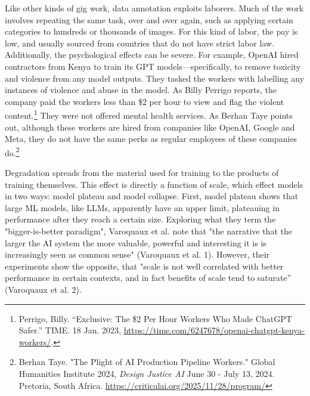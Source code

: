 \documentclass[11pt]{article}
\begin{document}
\begin{enumerate}
Like other kinds of gig work, data annotation exploits laborers. Much
of the work involves repeating the same task, over and over again,
such as applying certain categories to hundreds or thousands of
images. For this kind of labor, the pay is low, and usually sourced
from countries that do not have strict labor law. Additionally, the
psychological effects can be severe. For example, OpenAI hired
contractors from Kenya to train its GPT models---specifically, to
remove toxicity and violence from any model outputs. They tasked the
workers with labelling any instances of violence and abuse in the
model. As Billy Perrigo reports, the company paid the workers less
than \$2 per hour to view and flag the violent content.\footnote{Perrigo, Billy. “Exclusive: The \$2 Per Hour Workers Who Made
ChatGPT Safer.” TIME. 18 Jan. 2023,
\url{https://time.com/6247678/openai-chatgpt-kenya-workers/}.} They
were not offered mental health services. As Berhan Taye points out,
although these workers are hired from companies like OpenAI, Google
and Meta, they do not have the same perks as regular employees of
these companies do.\footnote{Berhan Taye. "The Plight of AI Production Pipeline Workers."
Global Humanities Institute 2024, \emph{Design Justice AI} June 30 - July
13, 2024. Pretoria, South Africa.
\url{https://criticalai.org/2025/11/28/program/}}

Degradation spreads from the material used for training to the
products of training themselves. This effect is directly a function of
scale, which effect models in two ways: model plateau and model
collapse. First, model plateau shows that large ML models, like LLMs,
apparently have an upper limit, plateauing in performance after they
reach a certain size. Exploring what they term the "bigger-is-better
paradigm", Varoquaux et al. note that "the narrative that the larger
the AI system the more valuable, powerful and interesting it is is
increasingly seen as common sense" (Varoquaux et al. 1). However,
their experiments show the opposite, that "scale is not well
correlated with better performance in certain contexts, and in fact
benefits of scale tend to saturate” (Varoquaux et al. 2).


\end{enumerate}
\end{document}
